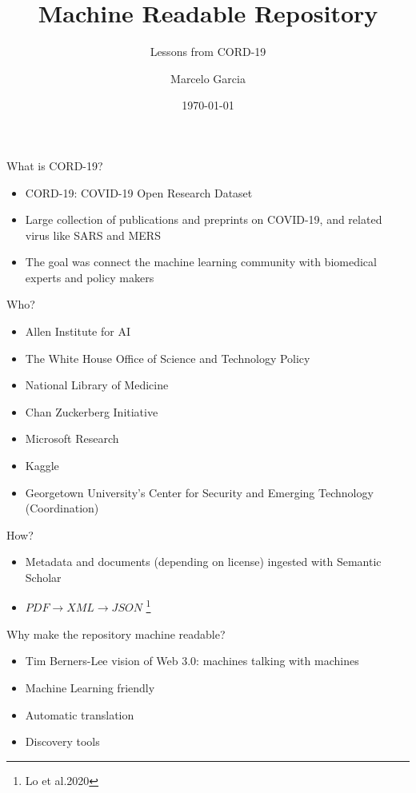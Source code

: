 \documentclass{beamer}
\title{Machine Readable Repository}
\subtitle{Lessons from CORD-19}
\author{Marcelo Garcia}
\institute{KAUST University Library}
\date{\today}
\begin{document}
\begin{frame}
\titlepage
\end{frame}

\begin{frame}{What is CORD-19?}
    \begin{itemize}
        \item CORD-19: COVID-19 Open Research Dataset
        \item Large collection of publications and preprints on COVID-19, and related virus like SARS and MERS
        \item The goal was connect the machine learning community with biomedical experts and policy makers    
    \end{itemize}
\end{frame}

\begin{frame}{Who?}
    \begin{itemize}
        \item Allen Institute for AI
        \item The White House Office of Science and Technology Policy
        \item National Library of Medicine
        \item Chan Zuckerberg Initiative
        \item Microsoft Research
        \item Kaggle
        \item Georgetown University's Center for Security and Emerging Technology (Coordination)
    \end{itemize}
\end{frame}

\begin{frame}{How?}
    \begin{itemize}
        \item Metadata and documents (depending on license) ingested with Semantic Scholar
        \item $PDF \rightarrow XML \rightarrow JSON$ \footnote{Lo et al.2020}
    \end{itemize}
\end{frame}

\begin{frame}{Why make the repository machine readable?}
    \begin{itemize}
        \item Tim Berners-Lee vision of Web 3.0: machines talking with machines
        \item Machine Learning friendly
        \item Automatic translation
        \item Discovery tools
    \end{itemize}
\end{frame}
\end{document}
